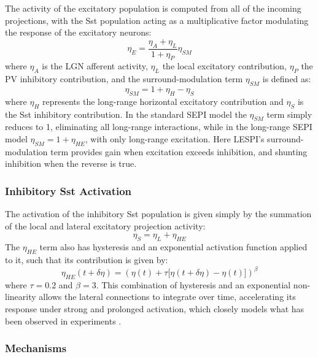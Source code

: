 The activity of the excitatory population is computed from all of the
incoming projections, with the Sst population acting as a
multiplicative factor modulating the response of the excitatory
neurons:
\begin{equation}
  \eta_{E} = \frac{\eta_{A} + \eta_{L}}{1 + \eta_{P}} \eta_{SM}
\end{equation}
where $\eta_{A}$ is the LGN afferent activity, $\eta_{L}$ the local
excitatory contribution, $\eta_{P}$ the PV inhibitory contribution,
and the surround-modulation term $\eta_{SM}$ is defined as:
\begin{equation}
  \eta_{SM} = 1 + \eta_{H} - \eta_{S}
\end{equation}
where $\eta_{H}$ represents the long-range horizontal excitatory
contribution and $\eta_{S}$ is the Sst inhibitory contribution.  In
the standard SEPI model the $\eta_{SM}$ term simply reduces to 1,
eliminating all long-range interactions, while in the long-range SEPI
model $\eta_{SM} = 1 + \eta_{HE}$, with only long-range excitation.
Here LESPI's surround-modulation term provides gain when excitation
exceeds inhibition, and shunting inhibition when the reverse is true.

\subsubsection*{Inhibitory Sst Activation}

The activation of the inhibitory Sst population is given simply by the
summation of the local and lateral excitatory projection activity:
\begin{equation}
  \eta_{S} = \eta_{L} + \eta_{HE}
\end{equation}
The $\eta_{HE}$ term also has hysteresis and an
exponential activation function applied to it, such that its
contribution is given by:
\begin{equation}
  \eta_{HE} (t + \delta\eta) = (\eta(t) + \tau \big[ \eta(t+\delta\eta) - \eta(t) \big])^\beta
\end{equation}
where $\tau=0.2$ and $\beta=3$. This combination of hysteresis and an
exponential non-linearity allows the lateral connections to integrate
over time, accelerating its response under strong and prolonged
activation, which closely models what has been observed in experiments
\citep{Beierlein2003,Bartley2008,Tan2008}.

\subsubsection*{Mechanisms}

